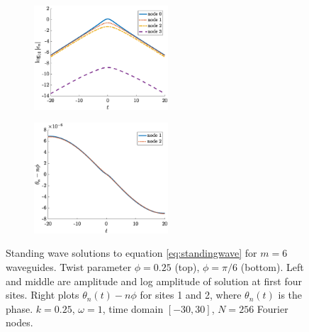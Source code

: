 \documentclass[11pt,reqno]{amsart}
\begin{document}
\begin{figure}
\begin{subfigure}{0.3\linewidth}
    \end{subfigure}
    \begin{subfigure}{0.3\linewidth}
        \caption{}
        \label{fig:m6pi6logamp}
        \includegraphics[width=5cm]{m6phipi6logamp.eps}
    \end{subfigure}
        \begin{subfigure}{0.3\linewidth}
        \caption{}
        \label{fig:m6pi6phase}
        \includegraphics[width=5cm]{m6phipi6phase.eps}
    \end{subfigure}
    \caption{Standing wave solutions to equation \cref{eq:standingwave} for $m=6$ waveguides. Twist parameter $\phi = 0.25$ (top), $\phi = \pi/6$ (bottom). Left and middle are amplitude and log amplitude of solution at first four sites. Right plots $\theta_n(t) - n \phi$ for sites 1 and 2, where $\theta_n(t)$ is the phase. $k=0.25$, $\omega=1$, time domain $[-30,30]$, $N=256$ Fourier nodes.}
    \label{fig:m6sol}
\end{figure}
\end{document}
